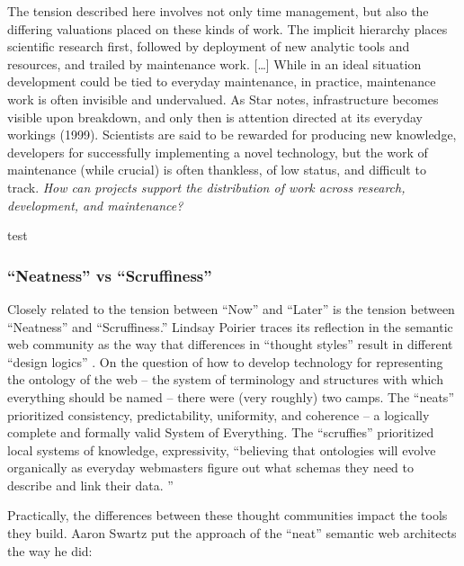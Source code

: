 \documentclass[10pt]{article}
\begin{document}
\begin{multicols}{2}
\begin{leftbar}
The tension described here involves not only time management, but also
the differing valuations placed on these kinds of work. The implicit
hierarchy places scientific research first, followed by deployment of
new analytic tools and resources, and trailed by maintenance work.
{[}\ldots{]} While in an ideal situation development could be tied to
everyday maintenance, in practice, maintenance work is often invisible
and undervalued. As Star notes, infrastructure becomes visible upon
breakdown, and only then is attention directed at its everyday workings
(1999). Scientists are said to be rewarded for producing new knowledge,
developers for successfully implementing a novel technology, but the
work of maintenance (while crucial) is often thankless, of low status,
and difficult to track. \emph{How can projects support the distribution
of work across research, development, and maintenance?} \cite{ribesLongNowTechnology2009} 
\end{leftbar}

\cite{gawerBridgingDifferingPerspectives2014} 

test

\hypertarget{neatness-vs-scruffiness}{%
\subsubsection{``Neatness'' vs
``Scruffiness''}\label{neatness-vs-scruffiness}}

Closely related to the tension between ``Now'' and ``Later'' is the
tension between ``Neatness'' and ``Scruffiness.'' Lindsay Poirier traces
its reflection in the semantic web community as the way that differences
in ``thought styles'' result in different ``design logics'' \cite{poirierTurnScruffyEthnographic2017} . On the question of how to
develop technology for representing the ontology of the web -- the
system of terminology and structures with which everything should be
named -- there were (very roughly) two camps. The ``neats'' prioritized
consistency, predictability, uniformity, and coherence -- a logically
complete and formally valid System of Everything. The ``scruffies''
prioritized local systems of knowledge, expressivity, ``believing that
ontologies will evolve organically as everyday webmasters figure out
what schemas they need to describe and link their data. \cite{poirierTurnScruffyEthnographic2017} ''

Practically, the differences between these thought communities impact
the tools they build. Aaron Swartz put the approach of the ``neat''
semantic web architects the way he did:


\end{multicols}
\end{document}

